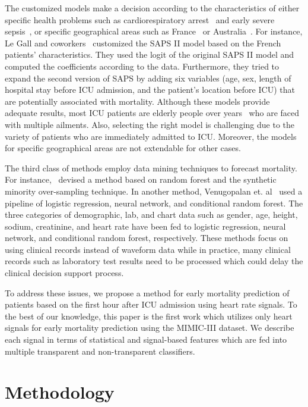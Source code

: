 \documentclass[3p]{elsarticle}
\begin{document}
The customized models make a decision according to the characteristics of either specific health problems such as cardiorespiratory arrest~\cite{dervishi_fuzzy_2017} and early severe sepsis~\cite{le_gall_customized_1995}, or specific geographical areas such as France~\cite{le_gall_mortality_2005} or Australia~\cite{metnitz_austrian_2009}. For instance, Le Gall and coworkers~\cite{le_gall_mortality_2005} customized the SAPS II model based on the French patients' characteristics. They used the logit of the original SAPS II model and computed the coefficients according to the data. Furthermore, they tried to expand the second version of SAPS by adding six variables (age, sex, length of hospital stay before ICU admission, and the patient's location before ICU) that are potentially associated with mortality. Although these models provide adequate results, most ICU patients are elderly people over  years~\cite{banerjee_validating_2017} who are faced with multiple ailments. Also, selecting the right model is challenging due to the variety of patients who are immediately admitted to ICU. Moreover, the models for specific geographical areas are not extendable for other cases. 

The third class of methods employ data mining techniques to forecast mortality. For instance,~\cite{awad_early_2017} devised a method based on random forest and the synthetic minority over-sampling technique. In another method, Venugopalan et. al~\cite{venugopalan_combination_2017} used a pipeline of logistic regression, neural network, and conditional random forest. The three categories of demographic, lab, and chart data such as gender, age, height, sodium, creatinine, and heart rate have been fed to logistic regression, neural network, and conditional random forest, respectively. These methods focus on using clinical records instead of waveform data while in practice, many clinical records such as laboratory test results need to be processed which could delay the clinical decision support process. 

To address these issues, we propose a method for early mortality prediction of patients based on the first hour after ICU admission using heart rate signals. To the best of our knowledge, this paper is the first work which utilizes only heart signals for early mortality prediction using the MIMIC-III dataset. We describe each signal in terms of  statistical and signal-based features which are fed into multiple transparent and non-transparent classifiers.

\section{Methodology}
  \label{sec:methodology}
\end{document}
